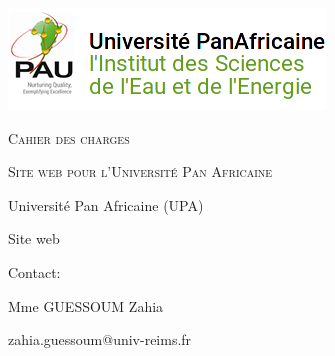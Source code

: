 \documentclass[oneside]{report}
\author{Nathan JANCZEWSKI, Léo BERGEROT, Loic HUSSON, Youness LOUCIF,\\ Alexandre QUILLET, Jonathan PAUGOIS }
\begin{document}
	\begin{titlepage}
		\centering		
		\includegraphics[scale=2]{logo}
		\vspace{5cm}
		{\par\scshape\Huge Cahier des charges \par}
		\vspace{0.5cm}
		{\par\scshape\Large Site web pour l'Université Pan Africaine\par}
		\vspace{10cm}
		{\par Université Pan Africaine (UPA)\par}
		{\par Site web \par}
		{\vfill}
		{\par Contact: \par}
		{\par\small Mme GUESSOUM Zahia\par}
		{\par zahia.guessoum@univ-reims.fr \par}
	\end{titlepage}		

\pagestyle{fancy}
\fancyhf{}

	\tableofcontents
	
\end{document}

